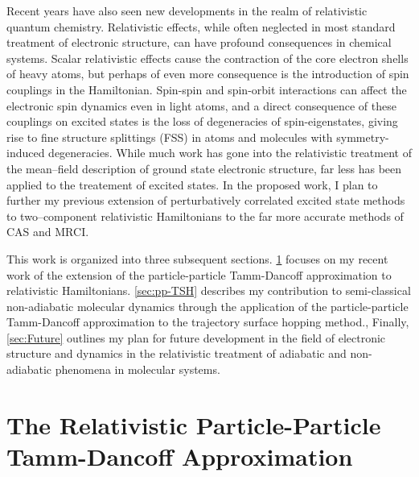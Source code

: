 \documentclass[12pt]{article}
\begin{document}
Recent years have also seen new developments in the realm of relativistic
quantum chemistry.  Relativistic effects, while often neglected in most
standard treatment of electronic structure, can have profound consequences in
chemical systems.\cite{Pyykko12_45} Scalar relativistic effects cause the
contraction of the core electron shells of heavy atoms, but perhaps of even
more consequence is the introduction of spin couplings in the Hamiltonian.
Spin-spin and spin-orbit interactions can affect the electronic spin dynamics
even in light atoms, and a direct consequence of these couplings on excited
states is the loss of degeneracies of spin-eigenstates, giving rise to fine
structure splittings (FSS) in atoms and molecules with symmetry-induced
degeneracies. While much work has gone into the relativistic treatment of the
mean--field description of ground state electronic structure, far less has been
applied to the treatement of excited states.  In the proposed work, I plan to
further my previous extension of perturbatively correlated excited state
methods to two--component relativistic Hamiltonians\cite{DBWY16_Accepted1} to
the far more accurate methods of CAS and MRCI.


This work is organized into three subsequent sections.
\cref{sec:pp-X2C} focuses on my recent work of the extension of the
particle-particle Tamm-Dancoff approximation to relativistic Hamiltonians.
\cite{DBWY16_Accepted1}
\cref{sec:pp-TSH} describes my contribution to semi-classical non-adiabatic
molecular dynamics through the application of the particle-particle Tamm-Dancoff
approximation to the trajectory surface hopping method.\cite{DBWY16_Submitted1},  
Finally,
\cref{sec:Future} outlines my plan for future development in the field of
electronic structure and dynamics in the relativistic treatment of adiabatic and
non-adiabatic phenomena in molecular systems.


\section{The Relativistic Particle-Particle Tamm-Dancoff Approximation}
\label{sec:pp-X2C}
\end{document}
